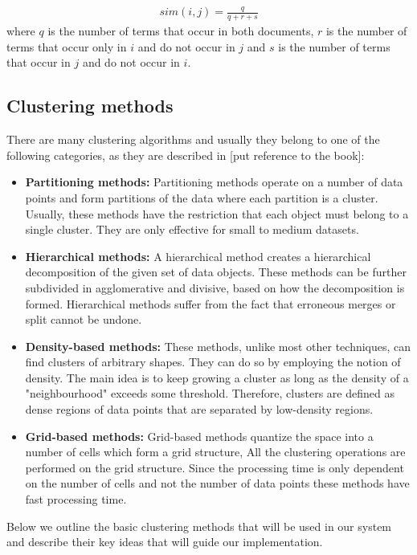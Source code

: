 \begin{eqnarray}
sim(i,j) = \frac{q}{q + r + s}  
\end{eqnarray} 
where $q$ is the number of terms that occur in both documents, $r$ is the number of terms that occur only in $i$ and do not occur in $j$ and $s$ is the  number of terms that occur in $j$ and do not occur in $i$.


\subsection{Clustering methods}
There are many clustering algorithms and usually they belong to one of the following categories, as they are described in [put reference to the book]:

\begin{itemize}
 \item \textbf{Partitioning methods:} Partitioning methods operate on a number of data points and form partitions of the data where each partition is a cluster. Usually, these methods have the restriction that each object must belong to a single cluster. They are only effective for small to medium datasets. 
 \item \textbf{Hierarchical methods:} A hierarchical method creates a hierarchical decomposition of the given set of data objects. These methods can be further subdivided 
 in agglomerative and divisive, based on how the decomposition is formed. Hierarchical methods suffer from the fact that erroneous merges or split cannot be undone. 
 \item \textbf{Density-based methods:} These methods, unlike most other techniques, can find clusters of arbitrary shapes. They can do so by employing the notion of density. The
 main idea is to keep growing a cluster as long as the density of a "neighbourhood" exceeds some threshold. Therefore, clusters are defined as dense regions of data points that are separated 
 by low-density regions.
 \item \textbf{Grid-based methods:} Grid-based methods quantize the space into a number of cells which form a grid structure, All the clustering operations are performed on the grid structure. Since the processing time is only dependent on the number of cells and not the number of data points these methods have fast processing time. 
\end{itemize}\vspace{15pt}
Below we outline the basic clustering methods that will be used in our system and describe their key ideas that will guide our implementation. 

